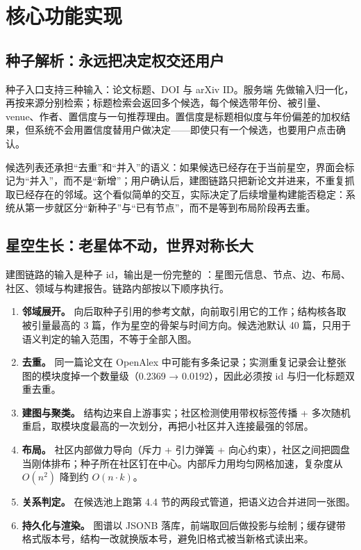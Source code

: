 \section{核心功能实现}

\subsection{种子解析：永远把决定权交还用户}

种子入口支持三种输入：论文标题、DOI 与 arXiv ID。服务端  先做输入归一化，再按来源分别检索；标题检索会返回多个候选，每个候选带年份、被引量、venue、作者、置信度与一句推荐理由。置信度是标题相似度与年份偏差的加权结果，但系统不会用置信度替用户做决定——即使只有一个候选，也要用户点击确认。

候选列表还承担“去重”和“并入”的语义：如果候选已经存在于当前星空，界面会标记为“并入”，而不是“新增”；用户确认后，建图链路只把新论文并进来，不重复抓取已经存在的邻域。这个看似简单的交互，实际决定了后续增量构建能否稳定：系统从第一步就区分“新种子”与“已有节点”，而不是等到布局阶段再去重。

\subsection{星空生长：老星体不动，世界对称长大}

建图链路的输入是种子 id，输出是一份完整的 ：星图元信息、节点、边、布局、社区、领域与构建报告。链路内部按以下顺序执行。

\begin{enumerate}
  \item \textbf{邻域展开。} 向后取种子引用的参考文献，向前取引用它的工作；结构核各取被引量最高的 3 篇，作为星空的骨架与时间方向。候选池默认 40 篇，只用于语义判定的输入范围，不等于全部入图。
  \item \textbf{去重。} 同一篇论文在 OpenAlex 中可能有多条记录；实测重复记录会让整张图的模块度掉一个数量级（0.2369 → 0.0192），因此必须按 id 与归一化标题双重去重。
  \item \textbf{建图与聚类。} 结构边来自上游事实；社区检测使用带权标签传播 + 多次随机重启，取模块度最高的一次划分，再把小社区并入连接最强的邻居。
  \item \textbf{布局。} 社区内部做力导向（斥力 + 引力弹簧 + 向心约束），社区之间把圆盘当刚体排布；种子所在社区钉在中心。内部斥力用均匀网格加速，复杂度从 $O(n^2)$ 降到约 $O(n\cdot k)$。
  \item \textbf{关系判定。} 在候选池上跑第 4.4 节的两段式管道，把语义边合并进同一张图。
  \item \textbf{持久化与渲染。} 图谱以 JSONB 落库，前端取回后做投影与绘制；缓存键带格式版本号，结构一改就换版本号，避免旧格式被当新格式读出来。
\end{enumerate}

